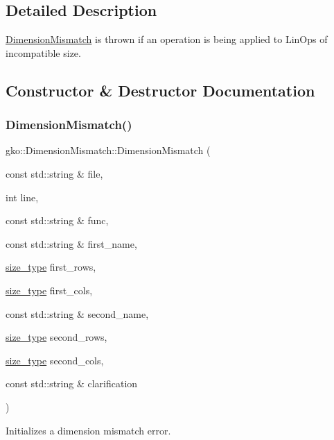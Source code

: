 \subsection{Detailed Description}
\hyperlink{classgko_1_1DimensionMismatch}{Dimension\+Mismatch} is thrown if an operation is being applied to Lin\+Ops of incompatible size. 

\subsection{Constructor \& Destructor Documentation}
\mbox{\label{classgko_1_1DimensionMismatch_ae9ece719cbd41a39835655ba3e70aa47}} 
\subsubsection{\texorpdfstring{Dimension\+Mismatch()}{DimensionMismatch()}}
{\footnotesize\ttfamily gko\+::\+Dimension\+Mismatch\+::\+Dimension\+Mismatch (\begin{DoxyParamCaption}\item[{const std\+::string \&}]{file,  }\item[{int}]{line,  }\item[{const std\+::string \&}]{func,  }\item[{const std\+::string \&}]{first\+\_\+name,  }\item[{\hyperlink{namespacegko_a6e5c95df0ae4e47aab2f604a22d98ee7}{size\+\_\+type}}]{first\+\_\+rows,  }\item[{\hyperlink{namespacegko_a6e5c95df0ae4e47aab2f604a22d98ee7}{size\+\_\+type}}]{first\+\_\+cols,  }\item[{const std\+::string \&}]{second\+\_\+name,  }\item[{\hyperlink{namespacegko_a6e5c95df0ae4e47aab2f604a22d98ee7}{size\+\_\+type}}]{second\+\_\+rows,  }\item[{\hyperlink{namespacegko_a6e5c95df0ae4e47aab2f604a22d98ee7}{size\+\_\+type}}]{second\+\_\+cols,  }\item[{const std\+::string \&}]{clarification }\end{DoxyParamCaption})}



Initializes a dimension mismatch error. 


